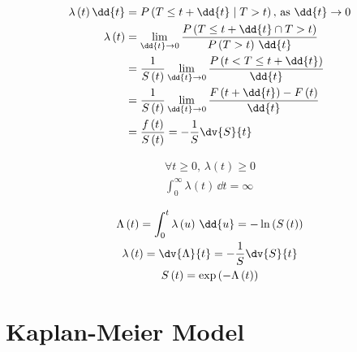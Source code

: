 \begin{subequations}\label{eq:survival:hazard_def}
\begin{align}
\lambda\left(t\right) \dd{t} &= P\left(T \leq t + \dd{t} \mid T > t\right),\,\text{as} \,\, \dd{t} \to 0 \label{eq:survival:hazard_def:a} \\
\lambda\left(t\right) &= \lim_{\dd{t} \to 0} \frac{P\left(T \leq t + \dd{t} \cap T > t\right)}{P\left(T > t\right)\,\dd{t}} \label{eq:survival:hazard_def:b} \\
&= \frac{1}{S\left(t\right)} \lim_{\dd{t} \to 0} \frac{P\left(t < T \leq t + \dd{t}\right)}{\dd{t}} \label{eq:survival:hazard_def:c} \\
&= \frac{1}{S\left(t\right)} \lim_{\dd{t} \to 0} \frac{F\left(t + \dd{t}\right) - F\left(t\right)}{\dd{t}} \label{eq:survival:hazard_def:d} \\
&= \frac{f\left(t\right)}{S\left(t\right)} = -\frac{1}{S} \dv{S}{t} \label{eq:survival:hazard_def:e}
\end{align}
\end{subequations}

\begin{subequations}\label{eq:survival:hazard_cond}
\begin{gather}
\forall t \geq 0, \, \lambda\left(t\right) \geq 0 \label{eq:survival:hazard_cond:a} \\
\int_{0}^{\infty} \lambda\left(t\right) \, \dd{t} = \infty \label{eq:survival:hazard_cond:b}
\end{gather}
\end{subequations}

\begin{subequations}\label{eq:survival:cum_hazard}
\begin{gather}
\Lambda\left(t\right) = \int_{0}^{t} \lambda\left(u\right) \, \dd{u} = - \ln\left(S\left(t\right)\right) \label{eq:survival:cum_hazard:def} \\
\lambda\left(t\right) = \dv{\Lambda}{t} = -\frac{1}{S} \dv{S}{t} \label{eq:survival:cum_hazard:to_lambda} \\
S\left(t\right) = \exp\left(-\Lambda\left(t\right)\right) \label{eq:survival:cum_hazard:to_S}
\end{gather}
\end{subequations}

\section{Kaplan-Meier Model}
\label{survival:km}

